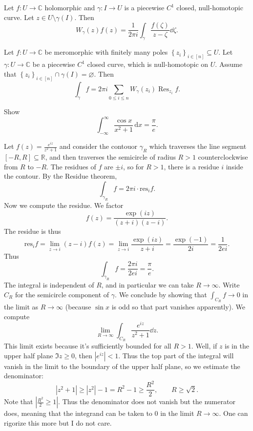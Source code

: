 \begin{theorem}\label{thm:3.0.15}
	Let $f : U \to \mathbb{C} $ holomorphic and $\gamma : I \to U$ is a piecewise $C^1$ closed, null-homotopic curve. Let $z\in U\setminus \gamma (I)$. Then
	\[
		W_\gamma (z)f(z) = \frac{1}{2\pi i} \int_{\gamma } \frac{f(\zeta )}{z-\zeta } \dd \zeta 
	.\]
\end{theorem}
\begin{theorem}[Residue]\label{thm:3.0.16}
	Let $f : U \to \mathbb{C} $ be meromorphic with finitely many poles $\left\{ z_i \right\} _{i\in[n]}\subseteq U$. Let $\gamma : U \to \mathbb{C} $ be a piecewise $C^1$ closed curve, which is null-homotopic on $U$. Assume that $\left\{ z_i \right\}_{i\in[n]} \cap \gamma (I) =\varnothing $. Then
	\[
		\int_{\gamma } f = 2\pi i\sum_{0\leq i\leq n} W_\gamma (z_i) \operatorname{Res}_{z_i} f
	.\]
\end{theorem}

\begin{example}
	Show
	\[
		\int_{-\infty }^{\infty } \frac{\cos x}{x^2+1}  \,\mathrm{d} x=\frac{\pi }{e} 
	.\]
\end{example}


Let $f(z) = \frac{e^{iz} }{z^2+1} $ and consider the contouor $\gamma _R$ which traverses the line segment $[-R,R]\subseteq \mathbb{R} $, and then traverses the semicircle of radius $R>1$ counterclockwise from $R$ to $-R$. The residues of $f$ are $\pm i$, so for $R>1$, there is a residue $i$ inside the contour. By the Residue theorem,
\[
	\int_{\gamma_R} f = 2\pi i\cdot  \mathrm{res}_{i} f
.\]
Now we compute the residue. We factor
\[
	f(z) = \frac{\exp (iz)}{(z+i)(z-i)} 
.\]
The residue is thus
\[
	\mathrm{res} _if = \lim_{z\to i} (z-i)f(z) = \lim_{z\to i} \frac{\exp (iz)}{z+i} =\frac{\exp (-1)}{2i} =\frac{1}{2ei} 
.\]
Thus
\[
	\int_{\gamma _R} f = \frac{2\pi i}{2ei} =\frac{\pi }{e} 
.\]
The integral is independent of $R$, and in particular we can take $R\to \infty $. Write $C_R$ for the semicircle component of $\gamma $. We conclude by showing that $\int_{C_R} f\to 0$ in the limit as $R\to \infty $ (because $\sin x$ is odd so that part vanishes apparently). We compute
\[
	\lim _{R\to \infty } \int_{C_R} \frac{e^{iz} }{z^2+1} \dd z
.\]
This limit exists because it's sufficiently bounded for all $R>1$. Well, if $z$ is in the upper half plane $\Im z \geq 0$, then $\left| e^{iz}  \right| <1$. Thus the top part of the integral will vanish in the limit to the boundary of the upper half plane, so we estimate the denominator:
\[
	\left| z^2+1 \right| \geq \left| z^2 \right| -1=R^2 - 1 \geq \frac{R^2}{2} ,\qquad R \geq \sqrt{2} 
.\]
Note that $\left| \frac{R^2}{2} \geq 1 \right| $. Thus the denominator does not vanish but the numerator does, meaning that the integrand can be taken to 0 in the limit $R\to \infty $. One can rigorize this more but I do not care.

